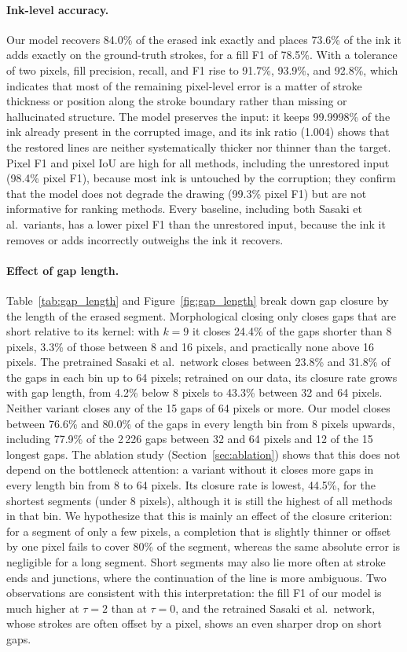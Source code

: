 \documentclass[11pt]{article}
\begin{document}
\paragraph{Ink-level accuracy.} Our model recovers 84.0\% of the erased ink exactly
and places 73.6\% of the ink it adds exactly on the ground-truth strokes, for a fill
F1 of 78.5\%. With a tolerance of two pixels, fill precision, recall, and F1 rise to
91.7\%, 93.9\%, and 92.8\%, which indicates that most of the remaining pixel-level
error is a matter of stroke thickness or position along the stroke boundary rather
than missing or hallucinated structure. The model preserves the input:
it keeps 99.9998\% of the ink already present in the corrupted image, and its ink
ratio (1.004) shows that the restored lines are neither systematically thicker nor
thinner than the target. Pixel F1 and pixel IoU are high for all methods, including
the unrestored input (98.4\% pixel F1), because most ink is untouched by the
corruption; they confirm that the model does not degrade the drawing (99.3\% pixel
F1) but are not informative for ranking methods. Every baseline, including both
Sasaki et al.\ variants, has a lower pixel F1 than the unrestored input, because the ink it removes or adds incorrectly outweighs the ink it recovers.

\paragraph{Effect of gap length.} Table~\ref{tab:gap_length} and
Figure~\ref{fig:gap_length} break down gap closure by the length of the erased
segment. Morphological closing only closes gaps that are short relative to its
kernel: with $k = 9$ it closes 24.4\% of the gaps shorter than 8 pixels, 3.3\% of
those between 8 and 16 pixels, and practically none above 16 pixels. The pretrained
Sasaki et al.\ network closes between 23.8\% and 31.8\% of the gaps in each bin up to
64 pixels; retrained on our data, its closure rate grows with gap length, from 4.2\%
below 8 pixels to 43.3\% between 32 and 64 pixels. Neither variant closes any of the
15 gaps of 64 pixels or more. Our model closes between 76.6\% and 80.0\% of the gaps
in every length bin from 8 pixels upwards, including 77.9\% of the 2\,226 gaps between
32 and 64 pixels and 12 of the 15 longest gaps. The ablation study (Section~\ref{sec:ablation}) shows that this does not depend on the bottleneck attention: a variant without it closes more gaps in every length bin from 8 to 64 pixels. Its closure rate
is lowest, 44.5\%, for the shortest segments (under 8 pixels), although it is still
the highest of all methods in that bin. We hypothesize that this is mainly an effect
of the closure criterion: for a segment of only a few pixels, a completion that is
slightly thinner or offset by one pixel fails to cover 80\% of the segment, whereas
the same absolute error is negligible for a long segment. Short segments may also lie
more often at stroke ends and junctions, where the continuation of the line is more
ambiguous. Two observations are consistent with this interpretation: the fill F1 of
our model is much higher at $\tau=2$ than at $\tau=0$, and the retrained Sasaki et
al.\ network, whose strokes are often offset by a pixel, shows an even sharper drop
on short gaps.
\end{document}
